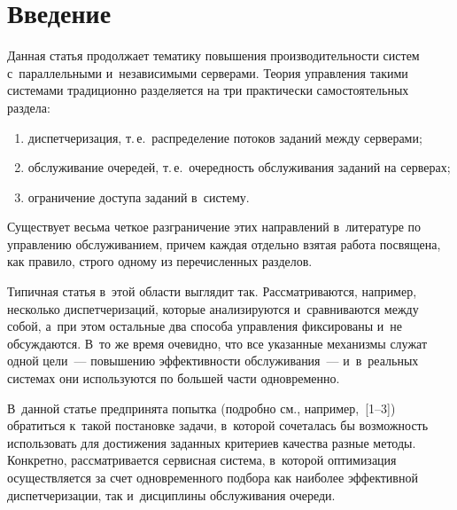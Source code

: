 
  
\vspace*{6pt}



\thispagestyle{headings}

\begin{multicols}{2}

\label{st\stat}

\section{Введение}

Данная статья продолжает тематику повышения производительности систем 
с~параллельными и~независимыми серверами. Теория управления такими 
системами традиционно разделяется на три практически самостоятельных 
раздела:
   \begin{enumerate}[(1)]
   \item диспетчеризация, т.\,е.\ распределение потоков заданий между 
серверами;
   \item обслуживание очередей, т.\,е.\ очередность обслуживания заданий на 
серверах;
   \item ограничение доступа заданий в~систему.
   \end{enumerate}
   
   Существует весьма четкое разграничение этих направлений в~литературе по 
управлению обслуживанием, причем каждая отдельно взятая работа посвящена, 
как правило, строго одному из пе\-ре\-чис\-лен\-ных разделов. 

Типичная статья в~этой 
области выглядит так. Рассматриваются, например, несколько 
диспетчеризаций, которые анализируются и~сравниваются между собой, а~при 
этом остальные два способа управ\-ле\-ния фиксированы и~не об\-суж\-да\-ют\-ся. В~то 
же время очевидно, что все указанные механизмы служат одной цели~--- 
повышению эффективности обслуживания~--- и~в~реальных системах они 
используются по большей части одновременно. 

В~данной статье предпринята 
попытка (подроб\-но см., например,~[1--3]) обратиться к~такой постановке задачи, 
в~которой сочеталась бы возможность использовать для достижения заданных 
критериев качества разные методы. Конкретно, рассматривается сервисная 
система, в~которой оптимизация осуществляется за счет одновременного 
подбора как наиболее эффективной диспетчеризации, так и~дисциплины 
обслуживания очереди.
   

\end{multicols}
